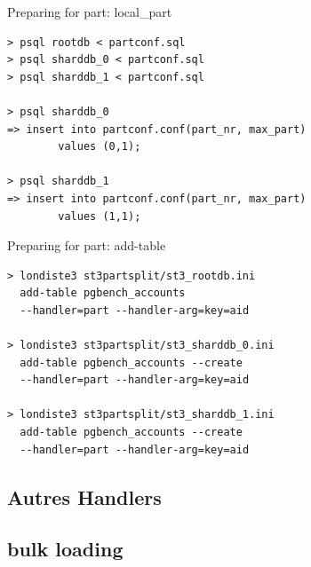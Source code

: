 \documentclass{beamer}
\begin{document}
\begin{frame}[fragile]{Preparing for part: local\_part}
\begin{verbatim}
> psql rootdb < partconf.sql
> psql sharddb_0 < partconf.sql
> psql sharddb_1 < partconf.sql

> psql sharddb_0
=> insert into partconf.conf(part_nr, max_part)
        values (0,1);

> psql sharddb_1
=> insert into partconf.conf(part_nr, max_part)
        values (1,1);
\end{verbatim}
\end{frame}

\begin{frame}[fragile]{Preparing for part: add-table}
\begin{verbatim}
> londiste3 st3partsplit/st3_rootdb.ini
  add-table pgbench_accounts
  --handler=part --handler-arg=key=aid

> londiste3 st3partsplit/st3_sharddb_0.ini
  add-table pgbench_accounts --create
  --handler=part --handler-arg=key=aid

> londiste3 st3partsplit/st3_sharddb_1.ini
  add-table pgbench_accounts --create
  --handler=part --handler-arg=key=aid
\end{verbatim}
\end{frame}

\subsection{Autres Handlers}


\subsection{bulk loading}
\end{document}
